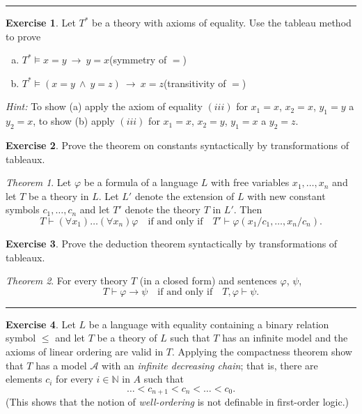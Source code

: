 \documentclass[11pt,a4paper]{amsart}
\theoremstyle{definition}
\newtheorem{problem}{Exercise}
\theoremstyle{remark}
\newtheorem*{theorem*}{Theorem}
\begin{document}
\smallskip
\hrule

\begin{problem} Let $T^*$ be a theory with axioms of equality. Use the tableau method to prove
\begin{enumerate}[(a)]
\itemsep6pt
\item $T^*\models x=y\ \to\ y=x$\hfill(symmetry of $=$)
\item $T^*\models (x=y\ \wedge\ y=z)\ \to\ x=z$\hfill(transitivity of $=$)
\end{enumerate}

\smallskip
{\it Hint:} To show (a) apply the axiom of equality $(iii)$ for $x_1=x$, $x_2=x$, $y_1=y$ a $y_2=x$, \newline
to show (b) apply $(iii)$ for $x_1=x$, $x_2=y$, $y_1=x$ a $y_2=z$.
\end{problem} 

\smallskip

\begin{problem} Prove the theorem on constants syntactically by transformations of tableaux.

\smallskip

\begin{theorem*} Let $\varphi$ be a formula of a language $L$ with free variables $x_1,\dots,x_n$ and let $T$ be a theory in $L$. Let $L'$ denote the extension of $L$ with new constant symbols $c_1,\dots,c_n$ and let $T'$ denote the theory $T$ in $L'$. Then
$$T \vdash (\forall x_1)\dots(\forall x_n)\varphi \quad\text{if and only if}\quad T'\vdash\varphi(x_1/c_1,\dots,x_n/c_n).$$
\end{theorem*}
\end{problem} 

\smallskip


\begin{problem} Prove the deduction theorem syntactically by transformations of tableaux.

\smallskip

\begin{theorem*} For every theory $T$ (in a closed form) and sentences $\varphi$, $\psi$,
$$T\vdash \varphi\to\psi\quad\text{if and only if}\quad T,\varphi\vdash\psi.$$
\end{theorem*}
\end{problem} 

\smallskip
\hrule



\begin{problem} Let $L$ be a language with equality containing a binary relation symbol $\le$ and let $T$ be a theory of $L$ such that $T$ has an infinite model and the axioms of linear ordering are valid in $T$. Applying the compactness theorem show that $T$ has a model $\mathcal{A}$ with an \emph{infinite decreasing chain}; that is, there are elements $c_i$ for every $i\in \mathbb{N}$ in $A$ such that
    $$\dots < c_{n+1} < c_n< \dots <c_0.$$
    (This shows that the notion of \emph{well-ordering} is not definable in first-order logic.)
\end{problem}
\end{document}
